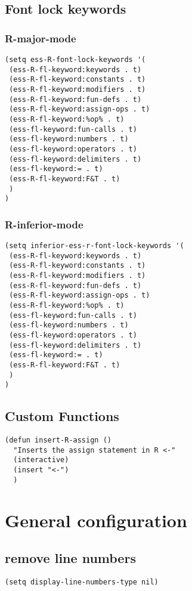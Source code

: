 \documentclass[11pt]{article}
\begin{document}
\subsection*{Font lock keywords}
\label{sec:org5d9b437}
\subsubsection*{R-major-mode}
\label{sec:orge9ea913}
\begin{verbatim}
(setq ess-R-font-lock-keywords '(
 (ess-R-fl-keyword:keywords . t)
 (ess-R-fl-keyword:constants . t)
 (ess-R-fl-keyword:modifiers . t)
 (ess-R-fl-keyword:fun-defs . t)
 (ess-R-fl-keyword:assign-ops . t)
 (ess-R-fl-keyword:%op% . t)
 (ess-fl-keyword:fun-calls . t)
 (ess-fl-keyword:numbers . t)
 (ess-fl-keyword:operators . t)
 (ess-fl-keyword:delimiters . t)
 (ess-fl-keyword:= . t)
 (ess-R-fl-keyword:F&T . t)
 )
)
\end{verbatim}

\subsubsection*{R-inferior-mode}
\label{sec:orge64a3ba}
\begin{verbatim}
(setq inferior-ess-r-font-lock-keywords '(
 (ess-R-fl-keyword:keywords . t)
 (ess-R-fl-keyword:constants . t)
 (ess-R-fl-keyword:modifiers . t)
 (ess-R-fl-keyword:fun-defs . t)
 (ess-R-fl-keyword:assign-ops . t)
 (ess-R-fl-keyword:%op% . t)
 (ess-fl-keyword:fun-calls . t)
 (ess-fl-keyword:numbers . t)
 (ess-fl-keyword:operators . t)
 (ess-fl-keyword:delimiters . t)
 (ess-fl-keyword:= . t)
 (ess-R-fl-keyword:F&T . t)
 )
)
\end{verbatim}
\subsection*{Custom Functions}
\label{sec:orgdb8d883}
\begin{verbatim}
(defun insert-R-assign ()
  "Inserts the assign statement in R <-"
  (interactive)
  (insert "<-")
  )
\end{verbatim}

\section*{General configuration}
\label{sec:org11bd8d2}
\subsection*{remove line numbers}
\label{sec:org86f91f2}
\begin{verbatim}
(setq display-line-numbers-type nil)
\end{verbatim}
\end{document}
